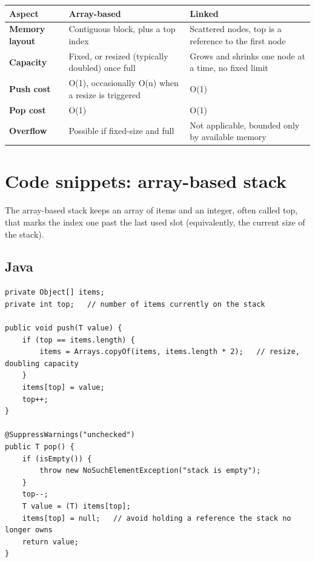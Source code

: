 \documentclass[11pt]{article}
\begin{document}
\begin{center}
\begin{minipage}{\linewidth}
\centering
{}
\renewcommand{\arraystretch}{1.3}
\begin{tabular}{>{\bfseries}l L{5.6cm} L{5.6cm}}
\toprule
{}
Aspect & Array-based & Linked \\
\midrule
Memory layout & Contiguous block, plus a top index & Scattered nodes, top is a reference to the first node \\
Capacity & Fixed, or resized (typically doubled) once full & Grows and shrinks one node at a time, no fixed limit \\
Push cost & O(1), occasionally O(n) when a resize is triggered & O(1) \\
Pop cost & O(1) & O(1) \\
Overflow & Possible if fixed-size and full & Not applicable, bounded only by available memory \\
\bottomrule
\end{tabular}
\end{minipage}
\end{center}


\section{Code snippets: array-based stack}

The array-based stack keeps an array of items and an integer, often called top, that marks
the index one past the last used slot (equivalently, the current size of the stack).

\subsection*{Java}

\begin{lstlisting}[style=java]
private Object[] items;
private int top;   // number of items currently on the stack

public void push(T value) {
    if (top == items.length) {
        items = Arrays.copyOf(items, items.length * 2);   // resize, doubling capacity
    }
    items[top] = value;
    top++;
}

@SuppressWarnings("unchecked")
public T pop() {
    if (isEmpty()) {
        throw new NoSuchElementException("stack is empty");
    }
    top--;
    T value = (T) items[top];
    items[top] = null;   // avoid holding a reference the stack no longer owns
    return value;
}
\end{lstlisting}
\end{document}
